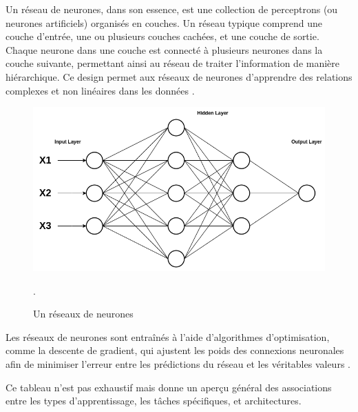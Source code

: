 Un réseau de neurones, dans son essence, est une collection de perceptrons (ou neurones artificiels) organisés en couches. Un réseau typique comprend une couche d'entrée, une ou plusieurs couches cachées, et une couche de sortie. Chaque neurone dans une couche est connecté à plusieurs neurones dans la couche suivante, permettant ainsi au réseau de traiter l'information de manière hiérarchique. Ce design permet aux réseaux de neurones d'apprendre des relations complexes et non linéaires dans les données \cite{Jaspreet_2022, Min69}.

\begin{figure}[H]
    \centering
    \includegraphics[width=12cm]{gfx/fig-nn.png}
    \caption{Un réseaux de neurones}.
    \label{fig:perceptron}
\end{figure}

Les réseaux de neurones sont entraînés à l'aide d'algorithmes d'optimisation, comme la descente de gradient, qui ajustent les poids des connexions neuronales afin de minimiser l'erreur entre les prédictions du réseau et les véritables valeurs \cite{antoine2018apprentissage}.

Ce tableau n'est pas exhaustif mais donne un aperçu général des associations entre les types d'apprentissage, les tâches spécifiques, et architectures.

